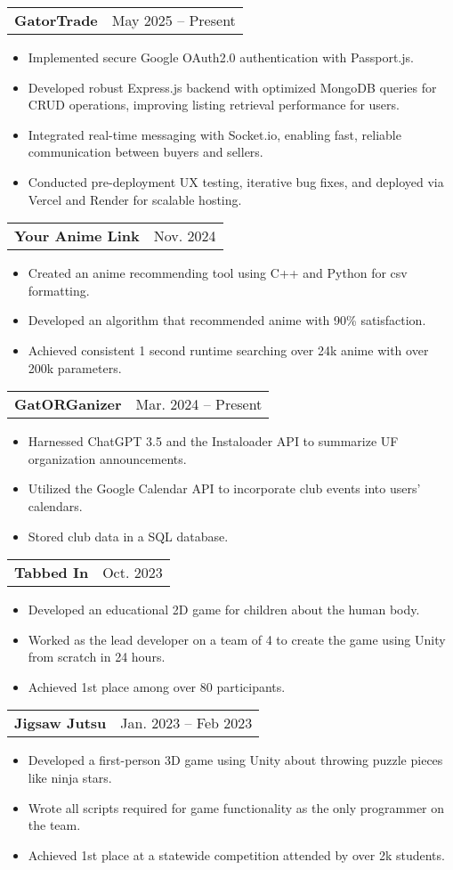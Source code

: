 \documentclass[letterpaper,11pt]{article}
\makeatletter
\newcommand{\resumeItem}[1]{
  \item\small{
    {#1 \vspace{-2pt}}
  }
}
\newcommand{\resumeSubSubheading}[2]{
    \item
    \begin{tabular*}{\textwidth}{l@{\extracolsep{\fill}}r}
      \textit{\small#1} & \textit{\small #2} \\
    \end{tabular*}\vspace{-7pt}
}
\newcommand{\resumeProjectHeading}[2]{
    \item
    \begin{tabular*}{\textwidth}{l@{\extracolsep{\fill}}r}
      \small\textbf{#1} & #2 \\
    \end{tabular*}\vspace{-7pt}
}
\newcommand{\resumeSubHeadingListEnd}{\end{itemize}}
\newcommand{\resumeItemListStart}{\begin{itemize}[leftmargin=0.15in]}
\newcommand{\resumeItemListEnd}{\end{itemize}\vspace{-5pt}}
\makeatother
\begin{document}
      \resumeProjectHeading
      {GatorTrade}{May 2025 -- Present}
      \resumeItemListStart
        \resumeItem{Implemented secure Google OAuth2.0 authentication with Passport.js.}
        \resumeItem{Developed robust Express.js backend with optimized MongoDB queries for CRUD operations, improving listing retrieval performance for users.}
        \resumeItem{Integrated real-time messaging with Socket.io, enabling fast, reliable communication between buyers and sellers.}
        \resumeItem{Conducted pre-deployment UX testing, iterative bug fixes, and deployed via Vercel and Render for scalable hosting.}
      \resumeItemListEnd

    \resumeProjectHeading
      {Your Anime Link}{Nov. 2024}
      \resumeItemListStart
        \resumeItem{Created an anime recommending tool using C++ and Python for csv formatting.}
        \resumeItem{Developed an algorithm that recommended anime with 90\% satisfaction.}
        \resumeItem{Achieved consistent 1 second runtime searching over 24k anime with over 200k parameters.}
    \resumeItemListEnd

    \resumeProjectHeading
      {GatORGanizer}{Mar. 2024 -- Present}
      \resumeItemListStart
        \resumeItem{Harnessed ChatGPT 3.5 and the Instaloader API to summarize UF organization announcements.}
        \resumeItem{Utilized the Google Calendar API to incorporate club events into users' calendars.}
        \resumeItem{Stored club data in a SQL database.}
      \resumeItemListEnd

      \resumeProjectHeading
      {Tabbed In}{Oct. 2023}
      \resumeItemListStart
        \resumeItem{Developed an educational 2D game for children about the human body.}
        \resumeItem{Worked as the lead developer on a team of 4 to create the game using Unity from scratch in 24 hours.}
        \resumeItem{Achieved 1st place among over 80 participants.}
    \resumeItemListEnd

    \resumeProjectHeading
      {Jigsaw Jutsu}{Jan. 2023 -- Feb 2023}
      \resumeItemListStart
        \resumeItem{Developed a first-person 3D game using Unity about throwing puzzle pieces like ninja stars.}
        \resumeItem{Wrote all scripts required for game functionality as the only programmer on the team.}
        \resumeItem{Achieved 1st place at a statewide competition attended by over 2k students.}
    \resumeItemListEnd
\end{document}
